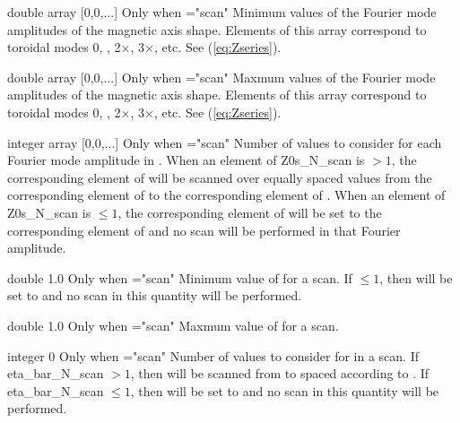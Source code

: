 \myhrule

{double array}
{[0,0,...]}
{Only when ={\ttfamily "scan"}}
{Minimum values of the Fourier mode amplitudes of the magnetic axis shape. Elements of this array correspond to toroidal modes 0, , 2$\times$, 3$\times$, etc.  See (\ref{eq:Zseries}).
}

\myhrule

{double array}
{[0,0,...]}
{Only when ={\ttfamily "scan"}}
{Maxmum values of the Fourier mode amplitudes of the magnetic axis shape. Elements of this array correspond to toroidal modes 0, , 2$\times$, 3$\times$, etc.  See (\ref{eq:Zseries}).
}

\myhrule

{integer array}
{[0,0,...]}
{Only when ={\ttfamily "scan"}}
{Number of values to consider for each Fourier mode amplitude in . When an element of {\ttfamily Z0s\_N\_scan} is $>1$, the corresponding element of  will be scanned over equally spaced values from the corresponding element of  to the corresponding element of .  When an element of {\ttfamily Z0s\_N\_scan} is $\le 1$, the corresponding element of  will be set to the corresponding element of  and no scan will be performed in that Fourier amplitude.
}

\myhrule

{double}
{1.0}
{Only when ={\ttfamily "scan"}}
{Minimum value of  for a scan. If $\le 1$, then  will be set to  and no scan in this quantity will be performed.
}

\myhrule

{double}
{1.0}
{Only when ={\ttfamily "scan"}}
{Maxmum value of  for a scan.
}

\myhrule

{integer}
{0}
{Only when ={\ttfamily "scan"}}
{Number of values to consider for  in a scan. If {\ttfamily eta\_bar\_N\_scan} $>1$, then  will be scanned from  to  spaced according to .
If {\ttfamily eta\_bar\_N\_scan} $\le 1$, then  will be set to  and no scan in
this quantity will be performed.
}

